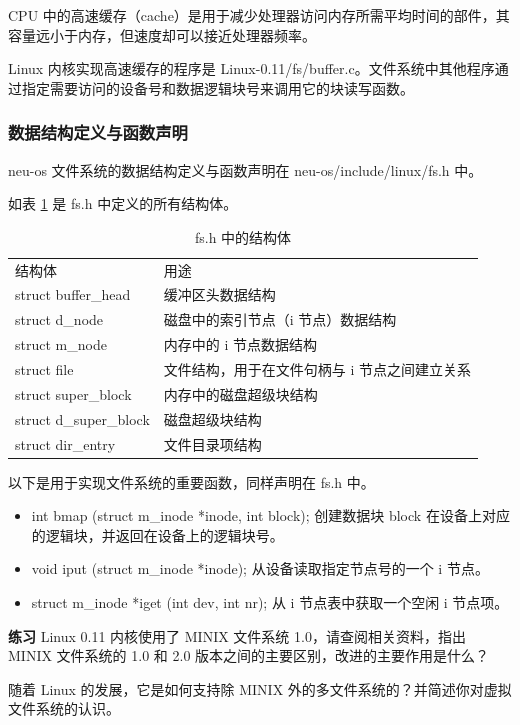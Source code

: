 CPU 中的高速缓存（cache）是用于减少处理器访问内存所需平均时间的部件，其容量远小于内存，但速度却可以接近处理器频率。

Linux 内核实现高速缓存的程序是 Linux-0.11/fs/buffer.c。文件系统中其他程序通过指定需要访问的设备号和数据逻辑块号来调用它的块读写函数。

\subsubsection{数据结构定义与函数声明}

neu-os 文件系统的数据结构定义与函数声明在 neu-os/include/linux/fs.h 中。

如表 \ref{tab:fs结构体} 是 fs.h 中定义的所有结构体。

\begin{table}[]
\caption{fs.h 中的结构体}
\label{tab:fs结构体}
\begin{tabular}{ll}
结构体 & 用途 \\
struct buffer\_head & 缓冲区头数据结构 \\
struct d\_node & 磁盘中的索引节点（i 节点）数据结构 \\
struct m\_node & 内存中的 i 节点数据结构 \\
struct file & 文件结构，用于在文件句柄与 i 节点之间建立关系 \\
struct super\_block & 内存中的磁盘超级块结构 \\
struct d\_super\_block & 磁盘超级块结构 \\
struct dir\_entry & 文件目录项结构
\end{tabular}
\end{table}

以下是用于实现文件系统的重要函数，同样声明在 fs.h 中。

\begin{itemize}
    \item int bmap (struct m\_inode *inode, int block); 创建数据块 block 在设备上对应的逻辑块，并返回在设备上的逻辑块号。
    \item void iput (struct m\_inode *inode); 从设备读取指定节点号的一个 i 节点。
    \item struct m\_inode *iget (int dev, int nr); 从 i 节点表中获取一个空闲 i 节点项。
    
\end{itemize}

\begin{mdframed}[hidealllines=true,backgroundcolor=gray!20]
\textbf{练习 }Linux 0.11 内核使用了 MINIX 文件系统 1.0，请查阅相关资料，指出 MINIX 文件系统的 1.0 和 2.0 版本之间的主要区别，改进的主要作用是什么？

随着 Linux 的发展，它是如何支持除 MINIX 外的多文件系统的？并简述你对虚拟文件系统的认识。
\end{mdframed}

